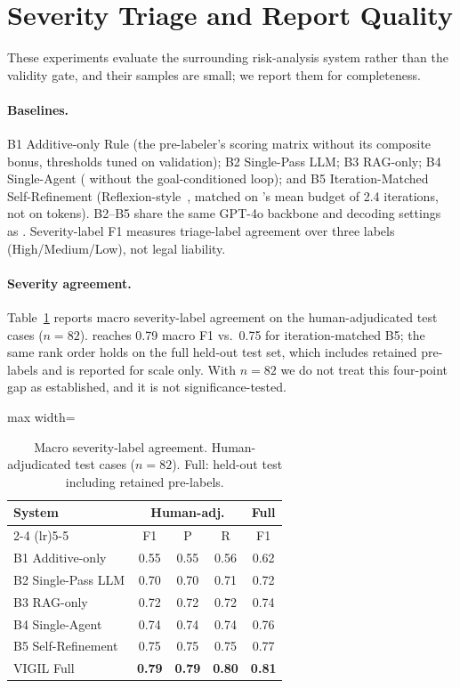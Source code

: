 \appendix

\section{Severity Triage and Report Quality}
\label{app:triage}

These experiments evaluate the surrounding risk-analysis system rather than the validity gate, and their samples are small; we report them for completeness.

\paragraph{Baselines.}
B1 Additive-only Rule (the pre-labeler's scoring matrix without its composite bonus, thresholds tuned on validation); B2 Single-Pass LLM; B3 RAG-only; B4 Single-Agent (\sysname{} without the goal-conditioned loop); and B5 Iteration-Matched Self-Refinement (Reflexion-style~\citep{shinn2023reflexion}, matched on \sysname{}'s mean budget of 2.4 iterations, not on tokens).
B2--B5 share the same GPT-4o backbone and decoding settings as \sysname{}.
Severity-label F1 measures triage-label agreement over three labels (High/Medium/Low), not legal liability.

\paragraph{Severity agreement.}
Table~\ref{tab:severity} reports macro severity-label agreement on the human-adjudicated test cases ($n = 82$).
\sysname{} reaches 0.79 macro F1 vs.\ 0.75 for iteration-matched B5; the same rank order holds on the full held-out test set, which includes retained pre-labels and is reported for scale only.
With $n = 82$ we do not treat this four-point gap as established, and it is not significance-tested.

\begin{table}[h]
\centering
\small
\setlength{\tabcolsep}{4pt}
\begin{adjustbox}{max width=\columnwidth}
\begin{tabular}{lcccc}
\toprule
System & \multicolumn{3}{c}{Human-adj.} & Full \\
\cmidrule(lr){2-4} \cmidrule(lr){5-5}
 & F1 & P & R & F1 \\
\midrule
B1 Additive-only & 0.55 & 0.55 & 0.56 & 0.62 \\
B2 Single-Pass LLM & 0.70 & 0.70 & 0.71 & 0.72 \\
B3 RAG-only & 0.72 & 0.72 & 0.72 & 0.74 \\
B4 Single-Agent & 0.74 & 0.74 & 0.74 & 0.76 \\
B5 Self-Refinement & 0.75 & 0.75 & 0.75 & 0.77 \\
VIGIL Full & \textbf{0.79} & \textbf{0.79} & \textbf{0.80} & \textbf{0.81} \\
\bottomrule
\end{tabular}
\end{adjustbox}
\caption{Macro severity-label agreement.
Human-adjudicated test cases ($n = 82$).
Full: held-out test including retained pre-labels.}
\label{tab:severity}
\end{table}

